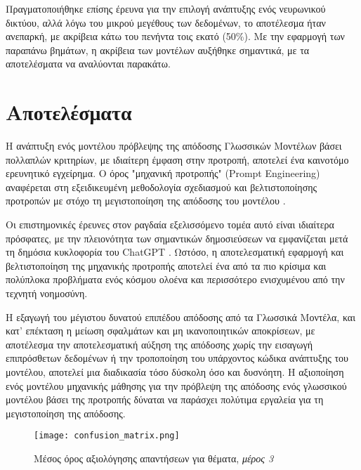 Πραγματοποιήθηκε επίσης έρευνα για την επιλογή ανάπτυξης ενός νευρωνικού
δικτύου, αλλά λόγω του μικρού μεγέθους των δεδομένων, το αποτέλεσμα ήταν
ανεπαρκή, με ακρίβεια κάτω του πενήντα τοις εκατό (50\%). Με την
εφαρμογή των παραπάνω βημάτων, η ακρίβεια των μοντέλων αυξήθηκε
σημαντικά, με τα αποτελέσματα να αναλύονται παρακάτω.

\section{Αποτελέσματα}

Η ανάπτυξη ενός μοντέλου πρόβλεψης της απόδοσης Γλωσσικών Μοντέλων βάσει
πολλαπλών κριτηρίων, με ιδιαίτερη έμφαση στην προτροπή, αποτελεί ένα
καινοτόμο ερευνητικό εγχείρημα. Ο όρος "μηχανική προτροπής"
(\textlatin{Prompt Engineering}) αναφέρεται στη εξειδικευμένη
μεθοδολογία σχεδιασμού και βελτιστοποίησης προτροπών με στόχο τη
μεγιστοποίηση της απόδοσης του μοντέλου \cite{10.1162/tacl_a_00324,
chen2024unleashingpotentialpromptengineering}.

Οι επιστημονικές έρευνες στον ραγδαία εξελισσόμενο τομέα αυτό είναι
ιδιαίτερα πρόσφατες, με την πλειονότητα των σημαντικών δημοσιεύσεων να
εμφανίζεται μετά τη δημόσια κυκλοφορία του \textlatin{ChatGPT}
\cite{greshake2023youvesignedforcompromising,
white2023promptpatterncatalogenhance}. Ωστόσο, η αποτελεσματική
εφαρμογή και βελτιστοποίηση της μηχανικής προτροπής αποτελεί ένα από τα
πιο κρίσιμα και πολύπλοκα προβλήματα ενός κόσμου ολοένα και περισσότερο
ενισχυμένου από την τεχνητή νοημοσύνη.

Η εξαγωγή του μέγιστου δυνατού επιπέδου απόδοσης από τα Γλωσσικά
Μοντέλα, και κατ' επέκταση η μείωση σφαλμάτων και μη ικανοποιητικών
αποκρίσεων, με αποτέλεσμα την αποτελεσματική αύξηση της απόδοσης χωρίς
την εισαγωγή επιπρόσθετων δεδομένων ή την τροποποίηση του υπάρχοντος
κώδικα ανάπτυξης του μοντέλου, αποτελεί μια διαδικασία τόσο δύσκολη όσο
και δυσνόητη. Η αξιοποίηση ενός μοντέλου μηχανικής μάθησης για την
πρόβλεψη της απόδοσης ενός γλωσσικού μοντέλου βάσει της προτροπής
δύναται να παράσχει πολύτιμα εργαλεία για τη μεγιστοποίηση της απόδοσης.

\begin{figure}[H]
  \begin{center}
    \texttt{[image: confusion\_matrix.png]}
    \caption{Μέσος όρος αξιολόγησης απαντήσεων για θέματα, \textit{μέρος
    3}}
  \end{center}
  \label{fig:SubjectQuery3}
\end{figure}

